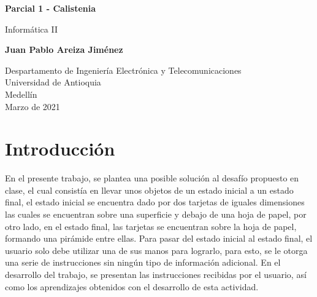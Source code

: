 \documentclass{article}
\begin{document}
\begin{titlepage}
    \begin{center}
        \vspace*{1cm}
            
        \Huge
        \textbf{Parcial 1 - Calistenia}
            
        \vspace{0.5cm}
        \LARGE
        Informática II
            
        \vspace{1.5cm}
            
        \textbf{Juan Pablo Areiza Jiménez}
            
        \vfill
            
        \vspace{0.8cm}
            
        \Large
        Despartamento de Ingeniería Electrónica y Telecomunicaciones\\
        Universidad de Antioquia\\
        Medellín\\
        Marzo de 2021
            
    \end{center}
\end{titlepage}

\tableofcontents
\newpage
\section{Introducción}\label{intro}
En el presente trabajo, se plantea una posible solución al desafío propuesto en clase, el cual consistía en llevar unos objetos de un estado inicial a un estado final, el estado inicial se encuentra dado por dos tarjetas de iguales dimensiones las cuales se encuentran sobre una superficie y debajo de una hoja de papel, por otro lado, en el estado final, las tarjetas se encuentran sobre la hoja de papel, formando una pirámide entre ellas. Para pasar del estado inicial al estado final, el usuario solo debe utilizar una de sus manos para lograrlo, para esto, se le otorga una serie de instrucciones sin ningún tipo de información adicional. En el desarrollo del trabajo, se presentan las instrucciones recibidas por el usuario, así como los aprendizajes obtenidos con el desarrollo de esta actividad.
\end{document}
